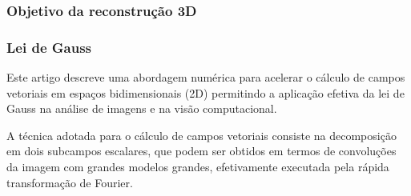 \begin{frame}
  \frametitle{Objetivo da reconstrução 3D}
  \frametitle{Lei de Gauss}

Este artigo descreve uma abordagem numérica para acelerar o cálculo de campos
vetoriais em espaços bidimensionais (2D) permitindo a aplicação efetiva da
lei de Gauss na análise de imagens e na visão computacional.

A técnica adotada para o cálculo de campos vetoriais consiste na decomposição
em dois subcampos escalares, que podem ser obtidos em termos de convoluções
da imagem com grandes modelos grandes, efetivamente executada pela rápida
  transformação de Fourier.

\end{frame}
